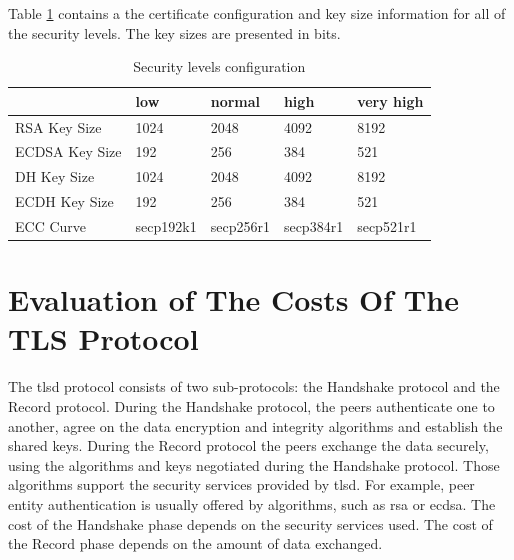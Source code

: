 Table \ref{table:sls-config-info} contains a the certificate configuration and key size information for all of the
security levels. The key sizes are presented in bits.

\begin{table}[]
\begin{tabular}{|l|l|l|l|l|}
\hline
               & \textbf{low} & \textbf{normal} & \textbf{high} & \textbf{very high} \\ \hline
RSA Key Size   & 1024         & 2048            & 4092          & 8192               \\ \hline
ECDSA Key Size & 192          & 256             & 384           & 521                \\ \hline
DH Key Size    & 1024         & 2048            & 4092          & 8192               \\ \hline
ECDH Key Size  & 192          & 256             & 384           & 521                \\ \hline
ECC Curve      & secp192k1    & secp256r1       & secp384r1     & secp521r1          \\ \hline
\end{tabular}
\centering \caption{\label{table:sls-config-info} Security levels configuration}
\end{table}

\section{Evaluation of The Costs Of The TLS Protocol} \label{sec:results}

The \gls{tlsd} protocol consists of two sub-protocols: the Handshake protocol and the Record protocol.
During the Handshake protocol, the peers authenticate one to another, agree on the data encryption and integrity
algorithms and establish the shared keys. During the Record protocol the peers exchange the data securely,
using the algorithms and keys negotiated during the Handshake protocol. Those algorithms support the security
services provided by \gls{tlsd}. For example, peer entity authentication is usually offered by algorithms, such
as \gls{rsa} or \gls{ecdsa}. The cost of the Handshake phase depends on the security services used. The cost
of the Record phase depends on the amount of data exchanged.

